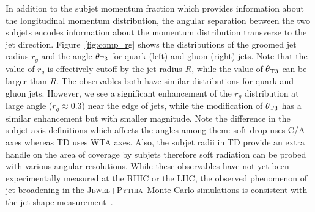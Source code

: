\documentclass[notoc]{JHEP3}
\newcommand{\jwpy}{\textsc{Jewel+Pythia}~}
\begin{document}
In addition to the subjet momentum fraction which provides information about the longitudinal momentum distribution, the angular separation between the two subjets encodes information about the momentum distribution transverse to the jet direction. Figure~\ref{fig:comp_rg} shows the distributions of the groomed jet radius $r_g$ and the angle $\theta_{\rm T3}$ for quark (left) and gluon (right) jets. Note that the value of $r_g$ is effectively cutoff by the jet radius $R$, while the value of $\theta_{\rm T3}$ can be larger than $R$. The observables both have similar distributions for quark and gluon jets. However, we see a significant enhancement of the $r_g$ distribution at large angle ($r_g\approx0.3$) near the edge of jets, while the modification of $\theta_{\rm T3}$ has a similar enhancement but with smaller magnitude. Note the difference in the subjet axis definitions which affects the angles among them: soft-drop uses C/A axes whereas TD uses WTA axes. Also, the subjet radii in TD provide an extra handle on the area of coverage by subjets therefore soft radiation can be probed with various angular resolutions. While these observables have not yet been experimentally measured at the RHIC or the LHC, the observed phenomenon of jet broadening in the \jwpy Monte Carlo simulations is consistent with the jet shape measurement~\cite{Chatrchyan:2013kwa}.

\end{document}
